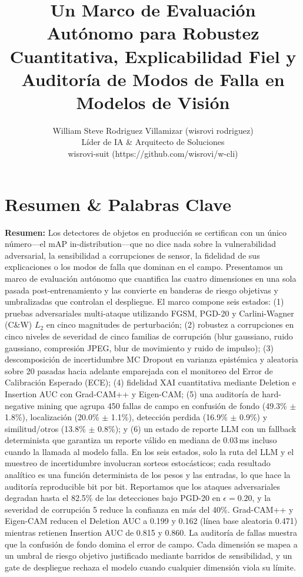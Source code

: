 \documentclass[10pt,twocolumn,letterpaper]{article}
\title{Un Marco de Evaluación Autónomo para Robustez Cuantitativa, Explicabilidad Fiel y Auditoría de Modos de Falla en Modelos de Visión}
\author{William Steve Rodriguez Villamizar (wisrovi rodriguez)\\Líder de IA \& Arquitecto de Soluciones\\wisrovi-suit (https://github.com/wisrovi/w-cli)}
\date{}
\begin{document}
\maketitle

\section{Resumen \& Palabras Clave}
\textbf{Resumen:} Los detectores de objetos en producción se certifican con un único número---el mAP in-distribution---que no dice nada sobre la vulnerabilidad adversarial, la sensibilidad a corrupciones de sensor, la fidelidad de sus explicaciones o los modos de falla que dominan en el campo. Presentamos un marco de evaluación autónomo que cuantifica las cuatro dimensiones en una sola pasada post-entrenamiento y las convierte en banderas de riesgo objetivas y umbralizadas que controlan el despliegue. El marco compone seis estados: (1) pruebas adversariales multi-ataque utilizando FGSM, PGD-20 y Carlini-Wagner (C\&W) $L_2$ en cinco magnitudes de perturbación; (2) robustez a corrupciones en cinco niveles de severidad de cinco familias de corrupción (blur gaussiano, ruido gaussiano, compresión JPEG, blur de movimiento y ruido de impulso); (3) descomposición de incertidumbre MC Dropout en varianza epistémica y aleatoria sobre 20 pasadas hacia adelante emparejada con el monitoreo del Error de Calibración Esperado (ECE); (4) fidelidad XAI cuantitativa mediante Deletion e Insertion AUC con Grad-CAM++ y Eigen-CAM; (5) una auditoría de hard-negative mining que agrupa 450 fallas de campo en confusión de fondo (49.3\% $\pm$ 1.8\%), localización (20.0\% $\pm$ 1.1\%), detección perdida (16.9\% $\pm$ 0.9\%) y similitud/otros (13.8\% $\pm$ 0.8\%); y (6) un estado de reporte LLM con un fallback determinista que garantiza un reporte válido en mediana de 0.03\,ms incluso cuando la llamada al modelo falla. En los seis estados, solo la ruta del LLM y el muestreo de incertidumbre involucran sorteos estocásticos; cada resultado analítico es una función determinista de los pesos y las entradas, lo que hace la auditoría reproducible bit por bit. Reportamos que los ataques adversariales degradan hasta el 82.5\% de las detecciones bajo PGD-20 en $\epsilon=0.20$, y la severidad de corrupción 5 reduce la confianza en más del 40\%. Grad-CAM++ y Eigen-CAM reducen el Deletion AUC a 0.199 y 0.162 (línea base aleatoria 0.471) mientras retienen Insertion AUC de 0.815 y 0.860. La auditoría de fallas muestra que la confusión de fondo domina el error de campo. Cada dimensión se mapea a un umbral de riesgo objetivo justificado mediante barridos de sensibilidad, y un gate de despliegue rechaza el modelo cuando cualquier dimensión viola su límite.
\end{document}
